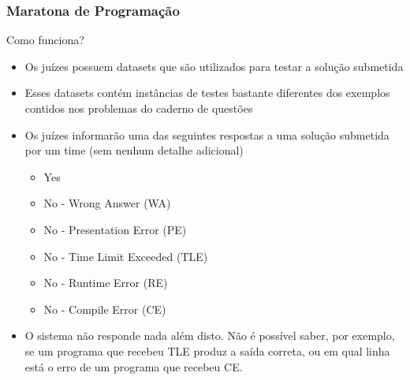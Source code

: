 \begin{frame}
\frametitle{Maratona de Programação}
\begin{block}{Como funciona?}
\begin{itemize}
	\item Os juízes possuem datasets que são utilizados para testar a solução submetida
	\item Esses datasets contém instâncias de testes bastante diferentes dos exemplos contidos nos problemas do caderno de questões
	\item Os juízes informarão uma das seguintes respostas a uma solução submetida por um time (sem nenhum detalhe adicional)
	\begin{itemize}
		\item Yes
		\item No - Wrong Answer (WA)
		\item No - Presentation Error (PE)
		\item No - Time Limit Exceeded (TLE)
		\item No - Runtime Error (RE)
		\item No - Compile Error (CE)
	\end{itemize}
	\item O sistema não responde nada além disto. Não é possível saber, por exemplo, se um programa que recebeu TLE produz a saída correta, ou em qual linha está o erro de um programa que recebeu CE.

\end{itemize}
\end{block}
\end{frame}

